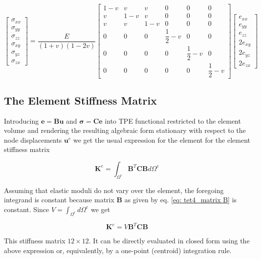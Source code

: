\begin{equation}
\begin{bmatrix}
\sigma_{xx}\\
\sigma_{yy}\\
\sigma_{zz}\\
\sigma_{xy}\\
\sigma_{yz}\\
\sigma_{zx}
\end{bmatrix} = \dfrac{E}{(1+v)(1-2v)} \begin{bmatrix}
1-v & v & v & 0 & 0 & 0\\
v & 1-v & v & 0 & 0 & 0\\
v & v & 1-v & 0 & 0 & 0\\
0 & 0 & 0 & \dfrac{1}{2}-v & 0 & 0\\
0 & 0 & 0 & 0 & \dfrac{1}{2}-v & 0\\
0 & 0 & 0 & 0 & 0 & \dfrac{1}{2}-v
\end{bmatrix} \begin{bmatrix}
e_{xx}\\
e_{yy}\\
e_{zz}\\
2e_{xy}\\
2e_{yz}\\
2e_{zx}
\end{bmatrix}
\end{equation}

\subsection{The Element Stiffness Matrix}
Introducing $ \mathbf{e} = \mathbf{B} \mathbf{u} $ and $ \mathbf{\sigma} = \mathbf{C} \mathbf{e} $ into TPE functional restricted to the element volume and rendering the resulting algebraic form stationary with respect to the node displacements $ \mathbf{u}^e $ we get the usual expression for the element for the element stiffness matrix

\begin{equation}
\mathbf{K}^e = \int_{\Omega^e} \mathbf{B}^T \mathbf{C} \mathbf{B} d \Omega^e
\end{equation}

Assuming that elastic moduli do not vary over the element, the foregoing integrand is constant because matrix $ \mathbf{B} $ as given by eq. \ref{eq: tet4_matrix B} is constant. Since $ V = \int_{\Omega^e} d \Omega^e $ we get

\begin{equation}
\mathbf{K}^e = V \mathbf{B}^T \mathbf{C} \mathbf{B}
\end{equation}

This stiffness matrix $ 12 \times 12 $. It can be directly evaluated in closed form using the above expression or, equivalently, by a one-point (centroid) integration rule.


